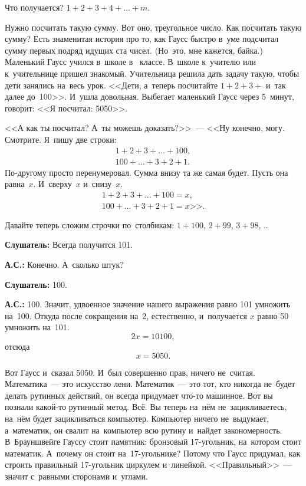 Что получается? $1+2+3+4+\ldots+m$.

Нужно посчитать такую сумму. Вот оно, треугольное число. Как посчитать такую сумму? Есть знаменитая
история про то, как Гаусс быстро в~уме подсчитал сумму первых подряд идущих ста чисел.
 (Но~это, мне кажется, байка.)
Маленький Гаусс учился в~школе в~ классе. В~школе к~учителю или к~учительнице пришел знакомый.
Учительница решила дать задачу такую, чтобы дети занялись на~весь урок. <<Дети, а~теперь посчитайте
$1+2+3+$ и~так далее до~100>>. И~ушла довольная. Выбегает маленький Гаусс через 5~минут, говорит: <<Я посчитал: 5050>>.

<<А как ты посчитал? А~ты можешь доказать?>>~--- <<Ну конечно, могу. Смотрите. Я~пишу две строки:
\begin{gather*}
1+2+3+\ldots+100,\\
100+\ldots+3+2+1.
\end{gather*}
По-другому просто перенумеровал. Сумма внизу та же самая будет. Пусть она равна~$x$. И~сверху~$x$ и~снизу~$x$.
\begin{gather*}
1+2+3+\ldots+100=x,\\
100+\ldots+3+2+1=x\text{>>}.
\end{gather*}

Давайте теперь сложим строчки по~столбикам: $1+100$, $2+99$, $3+98$, \ldots

\textbf{Слушатель:} Всегда получится 101.

\textbf{А.С.:} Конечно. А~сколько штук?

\textbf{Слушатель:} 100.

\textbf{А.С.:} 100. Значит, удвоенное значение нашего выражения равно 101 умножить на~100. Откуда
после сокращения на~2, естественно, и~получается $x$ равно 50 умножить на~101.
$$
2x = 10100,
$$
отсюда
$$
x = 5050.
$$


Вот Гаусс и~сказал 5050. И~был совершенно прав, ничего не~считая. Математика~--- это искусство
лени. Математик~--- это тот, кто никогда не~будет делать рутинных действий, он всегда придумает
что-то машинное. Вот вы познали какой-то рутинный метод. Всё. Вы теперь на~нём не~зацикливаетесь,
на~нём будет зацикливаться компьютер. Компьютер ничего не~выдумает, а~математик, он свалит
на~компьютер всю рутину и~найдет закономерность. В~Брауншвейге Гауссу стоит памятник: бронзовый
17-угольник, на~котором стоит математик. А~почему он стоит на~17-угольнике? Потому что Гаусс
придумал, как строить правильный 17-угольник циркулем и~линейкой. <<Правильный>>~--- значит
с~равными сторонами и~углами.

